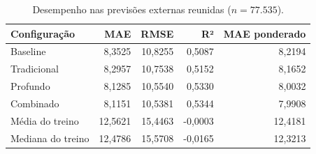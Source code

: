\begin{table}[htbp]
\centering\small
\caption{Desempenho nas previsões externas reunidas ($n=77.535$).}
\label{tab:metricas}
\begin{tabular}{lrrrr}
\toprule
Configuração & MAE & RMSE & R² & MAE ponderado \\
\midrule
Baseline & 8,3525 & 10,8255 & 0,5087 & 8,2194 \\
Tradicional & 8,2957 & 10,7538 & 0,5152 & 8,1652 \\
Profundo & 8,1285 & 10,5540 & 0,5330 & 8,0032 \\
Combinado & 8,1151 & 10,5381 & 0,5344 & 7,9908 \\
Média do treino & 12,5621 & 15,4463 & -0,0003 & 12,4181 \\
Mediana do treino & 12,4786 & 15,5708 & -0,0165 & 12,3213 \\
\bottomrule
\end{tabular}
\end{table}
